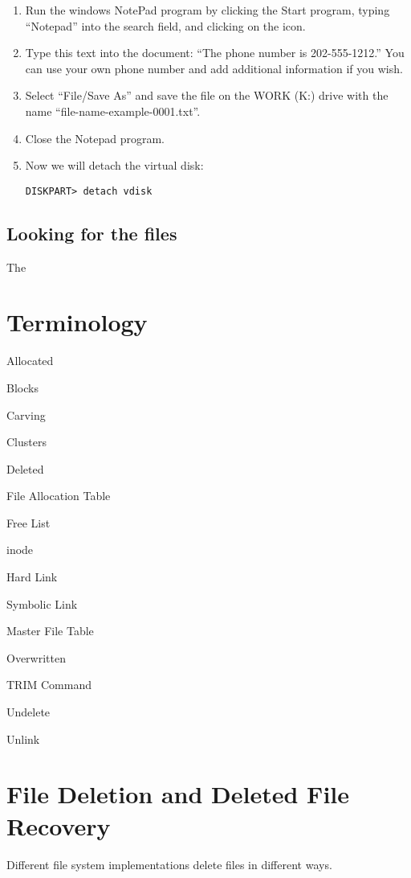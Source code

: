 \begin{enumerate}
\item Run the windows NotePad program by clicking the Start program,
typing ``Notepad'' into the search field, and clicking on the icon.

\item Type this text into the document:  ``The phone number is
202-555-1212.'' You can use your own phone number and add additional
information if you wish.

\item Select ``File/Save As'' and save the file on the WORK (K:) drive
with the name ``file-name-example-0001.txt''. 

\item Close the Notepad program.

\item Now we will detach the virtual disk:

\begin{Verbatim}
DISKPART> detach vdisk
\end{Verbatim}

\end{enumerate}

\subsection{Looking for the files}
The 

\section{Terminology}


Allocated

Blocks

Carving

Clusters

Deleted

File Allocation Table

Free List

inode

Hard Link

Symbolic Link

Master File Table

Overwritten

TRIM Command

Undelete

Unlink



\section{File Deletion and Deleted File Recovery}\label{deleted_file_recovery}
Different file system implementations delete files in different ways.

